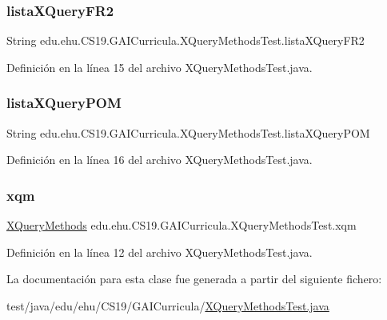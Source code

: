 \subsubsection{\texorpdfstring{listaXQueryFR2}{listaXQueryFR2}}
{\footnotesize\ttfamily String edu.\+ehu.\+C\+S19.\+G\+A\+I\+Curricula.\+X\+Query\+Methods\+Test.\+lista\+X\+Query\+F\+R2\hspace{0.3cm}{\ttfamily [package]}}



Definición en la línea 15 del archivo X\+Query\+Methods\+Test.\+java.

\mbox{\label{a00037_af899b7ca0c5c00c09a1265e7975c66a1}} 
\subsubsection{\texorpdfstring{listaXQueryPOM}{listaXQueryPOM}}
{\footnotesize\ttfamily String edu.\+ehu.\+C\+S19.\+G\+A\+I\+Curricula.\+X\+Query\+Methods\+Test.\+lista\+X\+Query\+P\+OM\hspace{0.3cm}{\ttfamily [package]}}



Definición en la línea 16 del archivo X\+Query\+Methods\+Test.\+java.

\mbox{\label{a00037_a39a41e2d9871da80d3ac11ea85702ed3}} 
\subsubsection{\texorpdfstring{xqm}{xqm}}
{\footnotesize\ttfamily \mbox{\hyperlink{a00033}{X\+Query\+Methods}} edu.\+ehu.\+C\+S19.\+G\+A\+I\+Curricula.\+X\+Query\+Methods\+Test.\+xqm\hspace{0.3cm}{\ttfamily [package]}}



Definición en la línea 12 del archivo X\+Query\+Methods\+Test.\+java.



La documentación para esta clase fue generada a partir del siguiente fichero\+:\begin{DoxyCompactItemize}
\item 
test/java/edu/ehu/\+C\+S19/\+G\+A\+I\+Curricula/\mbox{\hyperlink{a00011}{X\+Query\+Methods\+Test.\+java}}\end{DoxyCompactItemize}

